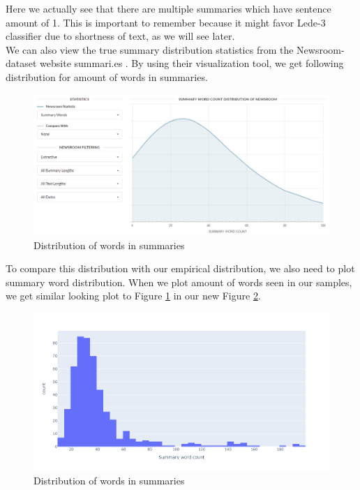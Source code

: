 \documentclass{article}
\begin{document}
\noindent
Here we actually see that there are multiple summaries which have sentence amount of 1. This is important to remember because it might favor Lede-3 classifier due to shortness of text, as we will see later.\\

\noindent
We can also view the true summary distribution statistics from the Newsroom-dataset website summari.es \cite{dataset}. By using their visualization tool, we get following distribution for amount of words in summaries. \\

\noindent
\begin{figure}[H]
	\centering
	\hspace*{-3cm}
	\includegraphics[scale=0.55]{words_in_summary.png}
	\caption{Distribution of words in summaries}
	\label{fig:words_in_summary}
\end{figure}

\noindent
To compare this distribution with our empirical distribution, we also need to plot summary word distribution. When we plot amount of words seen in our samples, we get similar looking plot to Figure \ref{fig:words_in_summary} in our new Figure \ref{fig:empirical_summary_words}.\\

\noindent
\begin{figure}[H]
	\centering
	\hspace*{-3cm}
	\includegraphics[scale=0.55]{empirical_summary_words.png}
	\caption{Distribution of words in summaries}
	\label{fig:empirical_summary_words}
\end{figure}
\end{document}
